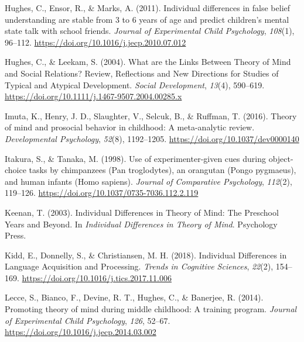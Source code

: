 \documentclass[
  man,floatsintext]{apa6}
\newlength{\cslhangindent}
\newlength{\cslentryspacingunit} %
\newenvironment{CSLReferences}[2] %
 {%
  \setlength{\parindent}{0pt}
  \ifodd #1
  \let\oldpar\par
  \def\par{\hangindent=\cslhangindent\oldpar}
  \fi
  \setlength{\parskip}{#2\cslentryspacingunit}
 }%
 {}
\begin{document}
\begin{CSLReferences}{1}{0}
\leavevmode{}%
Hughes, C., Ensor, R., \& Marks, A. (2011). Individual differences in false belief understanding are stable from 3 to 6 years of age and predict children's mental state talk with school friends. \emph{Journal of Experimental Child Psychology}, \emph{108}(1), 96--112. \url{https://doi.org/10.1016/j.jecp.2010.07.012}

\leavevmode{}%
Hughes, C., \& Leekam, S. (2004). What are the {Links Between Theory} of {Mind} and {Social Relations}? {Review}, {Reflections} and {New Directions} for {Studies} of {Typical} and {Atypical Development}. \emph{Social Development}, \emph{13}(4), 590--619. \url{https://doi.org/10.1111/j.1467-9507.2004.00285.x}

\leavevmode{}%
Imuta, K., Henry, J. D., Slaughter, V., Selcuk, B., \& Ruffman, T. (2016). Theory of mind and prosocial behavior in childhood: {A} meta-analytic review. \emph{Developmental Psychology}, \emph{52}(8), 1192--1205. \url{https://doi.org/10.1037/dev0000140}

\leavevmode{}%
Itakura, S., \& Tanaka, M. (1998). Use of experimenter-given cues during object-choice tasks by chimpanzees ({Pan} troglodytes), an orangutan ({Pongo} pygmaeus), and human infants ({Homo} sapiens). \emph{Journal of Comparative Psychology}, \emph{112}(2), 119--126. \url{https://doi.org/10.1037/0735-7036.112.2.119}

\leavevmode{}%
Keenan, T. (2003). Individual {Differences} in {Theory} of {Mind}: {The Preschool Years} and {Beyond}. In \emph{Individual {Differences} in {Theory} of {Mind}}. {Psychology Press}.

\leavevmode{}%
Kidd, E., Donnelly, S., \& Christiansen, M. H. (2018). Individual {Differences} in {Language Acquisition} and {Processing}. \emph{Trends in Cognitive Sciences}, \emph{22}(2), 154--169. \url{https://doi.org/10.1016/j.tics.2017.11.006}

\leavevmode{}%
Lecce, S., Bianco, F., Devine, R. T., Hughes, C., \& Banerjee, R. (2014). Promoting theory of mind during middle childhood: {A} training program. \emph{Journal of Experimental Child Psychology}, \emph{126}, 52--67. \url{https://doi.org/10.1016/j.jecp.2014.03.002}


\end{CSLReferences}
\end{document}
